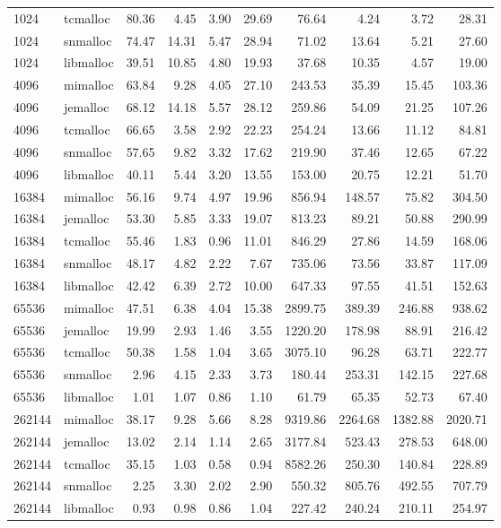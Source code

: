 \begin{table}[!htbp]
\begin{tabular}{llrrrrrrrr}
1024 & tcmalloc & 80.36 & 4.45 & 3.90 & 29.69 & 76.64 & 4.24 & 3.72 & 28.31 \\
1024 & snmalloc & 74.47 & 14.31 & 5.47 & 28.94 & 71.02 & 13.64 & 5.21 & 27.60 \\
1024 & libmalloc & 39.51 & 10.85 & 4.80 & 19.93 & 37.68 & 10.35 & 4.57 & 19.00 \\
4096 & mimalloc & 63.84 & 9.28 & 4.05 & 27.10 & 243.53 & 35.39 & 15.45 & 103.36 \\
4096 & jemalloc & 68.12 & 14.18 & 5.57 & 28.12 & 259.86 & 54.09 & 21.25 & 107.26 \\
4096 & tcmalloc & 66.65 & 3.58 & 2.92 & 22.23 & 254.24 & 13.66 & 11.12 & 84.81 \\
4096 & snmalloc & 57.65 & 9.82 & 3.32 & 17.62 & 219.90 & 37.46 & 12.65 & 67.22 \\
4096 & libmalloc & 40.11 & 5.44 & 3.20 & 13.55 & 153.00 & 20.75 & 12.21 & 51.70 \\
16384 & mimalloc & 56.16 & 9.74 & 4.97 & 19.96 & 856.94 & 148.57 & 75.82 & 304.50 \\
16384 & jemalloc & 53.30 & 5.85 & 3.33 & 19.07 & 813.23 & 89.21 & 50.88 & 290.99 \\
16384 & tcmalloc & 55.46 & 1.83 & 0.96 & 11.01 & 846.29 & 27.86 & 14.59 & 168.06 \\
16384 & snmalloc & 48.17 & 4.82 & 2.22 & 7.67 & 735.06 & 73.56 & 33.87 & 117.09 \\
16384 & libmalloc & 42.42 & 6.39 & 2.72 & 10.00 & 647.33 & 97.55 & 41.51 & 152.63 \\
65536 & mimalloc & 47.51 & 6.38 & 4.04 & 15.38 & 2899.75 & 389.39 & 246.88 & 938.62 \\
65536 & jemalloc & 19.99 & 2.93 & 1.46 & 3.55 & 1220.20 & 178.98 & 88.91 & 216.42 \\
65536 & tcmalloc & 50.38 & 1.58 & 1.04 & 3.65 & 3075.10 & 96.28 & 63.71 & 222.77 \\
65536 & snmalloc & 2.96 & 4.15 & 2.33 & 3.73 & 180.44 & 253.31 & 142.15 & 227.68 \\
65536 & libmalloc & 1.01 & 1.07 & 0.86 & 1.10 & 61.79 & 65.35 & 52.73 & 67.40 \\
262144 & mimalloc & 38.17 & 9.28 & 5.66 & 8.28 & 9319.86 & 2264.68 & 1382.88 & 2020.71 \\
262144 & jemalloc & 13.02 & 2.14 & 1.14 & 2.65 & 3177.84 & 523.43 & 278.53 & 648.00 \\
262144 & tcmalloc & 35.15 & 1.03 & 0.58 & 0.94 & 8582.26 & 250.30 & 140.84 & 228.89 \\
262144 & snmalloc & 2.25 & 3.30 & 2.02 & 2.90 & 550.32 & 805.76 & 492.55 & 707.79 \\
262144 & libmalloc & 0.93 & 0.98 & 0.86 & 1.04 & 227.42 & 240.24 & 210.11 & 254.97 \\
\bottomrule
\end{tabular}
\end{table}
